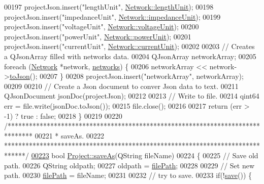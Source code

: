 \begin{DoxyCode}
00197   projectJson.insert(\textcolor{stringliteral}{"lengthUnit"}, \hyperlink{group___graphics_gae46c0e2bf39b343875e3c69066fe2652}{Network::lengthUnit});
00198   projectJson.insert(\textcolor{stringliteral}{"impedanceUnit"}, \hyperlink{group___graphics_ga5f3d72699a723c64a89d22e34df708ff}{Network::impedanceUnit});
00199   projectJson.insert(\textcolor{stringliteral}{"voltageUnit"}, \hyperlink{group___graphics_gacde031ef95f5c05565ee35769f2ed89e}{Network::voltageUnit});
00200   projectJson.insert(\textcolor{stringliteral}{"powerUnit"}, \hyperlink{group___graphics_ga9504015bc566f4a3d3b4d4a86000293b}{Network::powerUnit});
00201   projectJson.insert(\textcolor{stringliteral}{"currentUnit"}, \hyperlink{group___graphics_gac6a26db5fef2b1dd2a00faf6340d1702}{Network::currentUnit});
00202 
00203   \textcolor{comment}{// Creates a QJsonArray filled with networks data.}
00204   QJsonArray networkArray;
00205   \textcolor{keywordflow}{foreach} (\hyperlink{class_network}{Network} *network, \hyperlink{class_project_aa98126154cab59769a431668e6f17daf}{networks}) \{
00206     networkArray << network->\hyperlink{group___graphics_ga1bb9773d3935eefef84136d388786494}{toJson}();
00207   \}
00208   projectJson.insert(\textcolor{stringliteral}{"networkArray"}, networkArray);
00209 
00210   \textcolor{comment}{// Create a Json document to conver Json data to text.}
00211   QJsonDocument jsonDoc(projectJson);
00212 
00213   \textcolor{comment}{// Write to file.}
00214   qint64 err = file.write(jsonDoc.toJson());
00215   file.close();
00216 
00217   \textcolor{keywordflow}{return} (err > -1) ? \textcolor{keyword}{true} : \textcolor{keyword}{false};
00218 \}
00219 
00220 \textcolor{comment}{/*******************************************************************************}
00221 \textcolor{comment}{ * saveAs.}
00222 \textcolor{comment}{ ******************************************************************************/}
\hypertarget{project_8cpp_source_l00223}{}\hyperlink{class_project_ad32a31d548ad38f4cbbe0f95879a68e5}{00223} \textcolor{keywordtype}{bool} \hyperlink{class_project_ad32a31d548ad38f4cbbe0f95879a68e5}{Project::saveAs}(QString fileName)
00224 \{
00225   \textcolor{comment}{// Save old path.}
00226   QString oldpath;
00227   oldpath = \hyperlink{class_project_a79f30adcefd0b72bd4ac7db724bc9531}{filePath};
00228 
00229   \textcolor{comment}{// Set new path.}
00230   \hyperlink{class_project_a79f30adcefd0b72bd4ac7db724bc9531}{filePath} = fileName;
00231 
00232   \textcolor{comment}{// try to save.}
00233   \textcolor{keywordflow}{if}(!\hyperlink{class_project_a596a875bc5be73bc5b1b71b6448c1e07}{save}()) \{

\end{DoxyCode}
